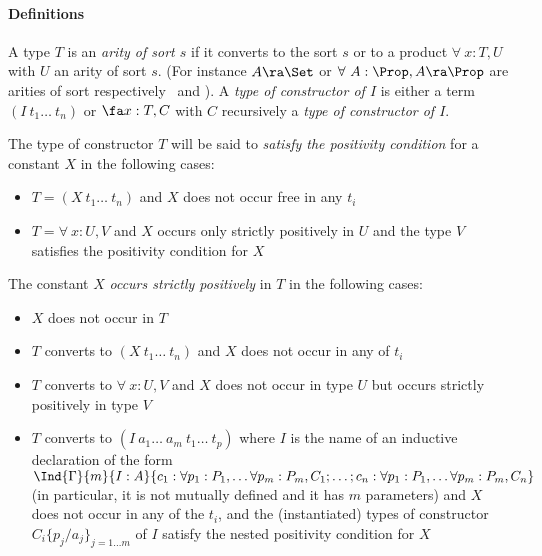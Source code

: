 \paragraph[Definitions]{Definitions\label{Positivity}}

A type $T$ is an {\em arity of sort $s$} if it converts
to the sort $s$ or to a product $\forall~x:T,U$ with $U$ an arity
of sort $s$. (For instance $A\ra \Set$ or $\forall~A:\Prop,A\ra
\Prop$ are arities of sort respectively \Set\ and \Prop).  A {\em type
  of constructor of $I$} is either a term
$(I~t_1\ldots ~t_n)$ or $\fa x:T,C$ with $C$ recursively 
a {\em type of constructor of $I$}.

\smallskip

The type of constructor $T$ will be said to {\em satisfy the positivity
condition} for a constant $X$ in the following cases:

\begin{itemize}
\item $T=(X~t_1\ldots ~t_n)$ and $X$ does not occur free in
any $t_i$
\item $T=\forall~x:U,V$ and $X$ occurs only strictly positively in $U$ and
the type $V$ satisfies the positivity condition for $X$
\end{itemize}

The constant $X$ {\em occurs strictly positively} in $T$ in the
following cases:

\begin{itemize}
\item $X$ does not occur in $T$
\item $T$ converts to $(X~t_1 \ldots ~t_n)$ and $X$ does not occur in
  any of $t_i$
\item $T$ converts to $\forall~x:U,V$ and $X$ does not occur in
  type $U$ but occurs strictly positively in type $V$
\item $T$ converts to $(I~a_1 \ldots ~a_m ~ t_1 \ldots ~t_p)$ where
  $I$ is the name of an inductive declaration of the form
  $\Ind{\Gamma}{m}{I:A}{c_1:\forall p_1:P_1,\ldots \forall
    p_m:P_m,C_1;\ldots;c_n:\forall p_1:P_1,\ldots \forall
    p_m:P_m,C_n}$ 
  (in particular, it is not mutually defined and it has $m$
  parameters) and $X$ does not occur in any of the $t_i$, and the
  (instantiated) types of constructor $C_i\{p_j/a_j\}_{j=1\ldots m}$
  of $I$ satisfy 
  the nested positivity condition for $X$
\end{itemize}

